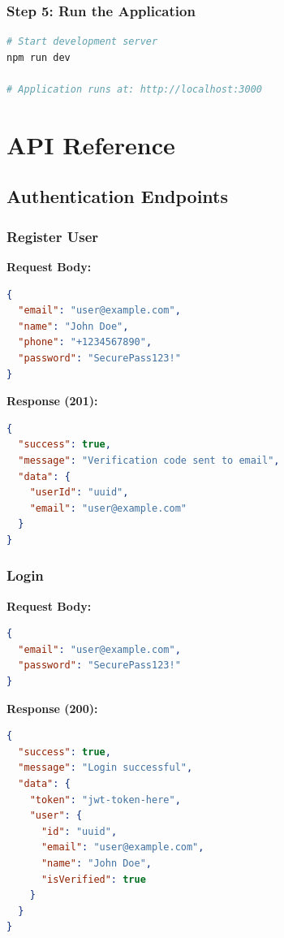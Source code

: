 \documentclass[12pt,a4paper]{article}
\begin{document}
\subsubsection{Step 5: Run the Application}

\begin{lstlisting}[language=bash]
# Start development server
npm run dev

# Application runs at: http://localhost:3000
\end{lstlisting}

\section{API Reference}

\subsection{Authentication Endpoints}

\subsubsection{Register User}

\begin{tcolorbox}[colback=gray!5!white,colframe=gray!75!black,title=POST /api/auth/register]
\textbf{Request Body:}
\begin{lstlisting}[language=json]
{
  "email": "user@example.com",
  "name": "John Doe",
  "phone": "+1234567890",
  "password": "SecurePass123!"
}
\end{lstlisting}

\textbf{Response (201):}
\begin{lstlisting}[language=json]
{
  "success": true,
  "message": "Verification code sent to email",
  "data": {
    "userId": "uuid",
    "email": "user@example.com"
  }
}
\end{lstlisting}
\end{tcolorbox}

\subsubsection{Login}

\begin{tcolorbox}[colback=gray!5!white,colframe=gray!75!black,title=POST /api/auth/login]
\textbf{Request Body:}
\begin{lstlisting}[language=json]
{
  "email": "user@example.com",
  "password": "SecurePass123!"
}
\end{lstlisting}

\textbf{Response (200):}
\begin{lstlisting}[language=json]
{
  "success": true,
  "message": "Login successful",
  "data": {
    "token": "jwt-token-here",
    "user": {
      "id": "uuid",
      "email": "user@example.com",
      "name": "John Doe",
      "isVerified": true
    }
  }
}
\end{lstlisting}
\end{tcolorbox}
\end{document}
